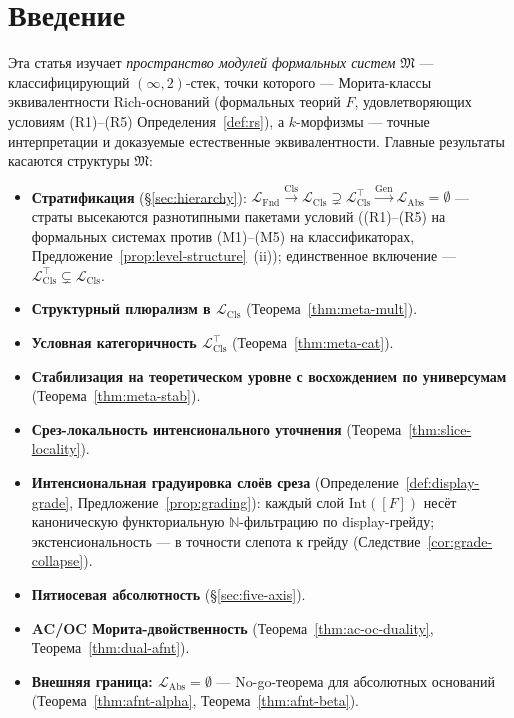 \documentclass[11pt]{article}
\theoremstyle{plain}
\theoremstyle{definition}
\newcommand{\fM}{\mathfrak{M}}
\newcommand{\LFnd}{\mathcal{L}_{\mathrm{Fnd}}}
\newcommand{\LCls}{\mathcal{L}_{\mathrm{Cls}}}
\newcommand{\LClsMax}{\mathcal{L}_{\mathrm{Cls}}^{\top}}
\newcommand{\LAbs}{\mathcal{L}_{\mathrm{Abs}}}
\begin{document}
\begin{abstract}
\smallskip
\noindent\textbf{Ключевые слова:} пространство модулей формальных систем, классифицирующие $2$-стеки, категорная логика, $(\infty, n)$-категории, теория высших топосов, интенсиональная теория типов, мета-классификация, эффективный топос, no-go-теоремы.

\smallskip
\noindent\textbf{MSC2020:} 03A05, 03B30, 03C45, 03F40, 18A05, 18N10, 18N50, 18N60, 18N65.

\end{abstract}

\newpage
\tableofcontents
\newpage

\section{Введение}

Эта статья изучает \emph{пространство модулей формальных систем} $\fM$ — классифицирующий $(\infty, 2)$-стек, точки которого — Морита-классы эквивалентности Rich-оснований (формальных теорий $F$, удовлетворяющих условиям (R1)--(R5) Определения~\ref{def:rs}), а $k$-морфизмы — точные интерпретации и доказуемые естественные эквивалентности. Главные результаты касаются структуры $\fM$:
\begin{itemize}
\item \textbf{Стратификация} (\S\ref{sec:hierarchy}): $\LFnd \xrightarrow{\mathrm{Cls}} \LCls \supsetneq \LClsMax \xrightarrow{\mathrm{Gen}} \LAbs = \emptyset$ --- страты высекаются разнотипными пакетами условий ((R1)--(R5) на формальных системах против (M1)--(M5) на классификаторах, Предложение~\ref{prop:level-structure}~(ii)); единственное включение --- $\LClsMax \subsetneq \LCls$.
\item \textbf{Структурный плюрализм в $\LCls$} (Теорема~\ref{thm:meta-mult}).
\item \textbf{Условная категоричность $\LClsMax$} (Теорема~\ref{thm:meta-cat}).
\item \textbf{Стабилизация на теоретическом уровне с восхождением по универсумам} (Теорема~\ref{thm:meta-stab}).
\item \textbf{Срез-локальность интенсионального уточнения} (Теорема~\ref{thm:slice-locality}).
\item \textbf{Интенсиональная градуировка слоёв среза} (Определение~\ref{def:display-grade}, Предложение~\ref{prop:grading}): каждый слой $\mathrm{Int}([F])$ несёт каноническую функториальную $\mathbb{N}$-фильтрацию по display-грейду; экстенсиональность — в точности слепота к грейду (Следствие~\ref{cor:grade-collapse}).
\item \textbf{Пятиосевая абсолютность} (\S\ref{sec:five-axis}).
\item \textbf{AC/OC Морита-двойственность} (Теорема~\ref{thm:ac-oc-duality}, Теорема~\ref{thm:dual-afnt}).
\item \textbf{Внешняя граница: $\LAbs = \emptyset$} --- No-go-теорема для абсолютных оснований (Теорема~\ref{thm:afnt-alpha}, Теорема~\ref{thm:afnt-beta}).
\end{itemize}
\end{document}
